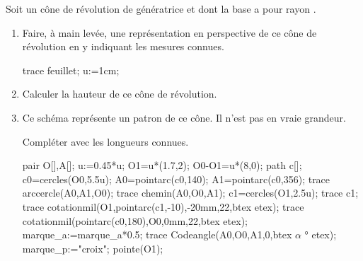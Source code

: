\begin{exercice*}
    Soit un cône de révolution de génératrice  et dont la base a pour rayon .
    \begin{enumerate}
        \item Faire, à main levée, une représentation en perspective de ce cône de révolution en y indiquant les mesures connues.
        \begin{center}
            \begin{Geometrie}[CoinBG={(-4u,-2u)},CoinHD={(5u,6u)}]
                trace feuillet;
                u:=1cm;
            \end{Geometrie}
        \end{center}
        \item Calculer la hauteur de ce cône de révolution.
        \item Ce schéma représente un patron de ce cône. Il n'est pas en vraie grandeur.
        
        Compléter avec les longueurs connues.
        \begin{center}
            \begin{Geometrie}[CoinBG={(-4u,-2u)}]
                pair O[],A[];
                u:=0.45*u;
                O1=u*(1.7,2);
                O0-O1=u*(8,0);            
                path c[];
                c0=cercles(O0,5.5u);
                A0=pointarc(c0,140);
                A1=pointarc(c0,356);
                trace arccercle(A0,A1,O0);
                trace chemin(A0,O0,A1);
                c1=cercles(O1,2.5u);
                trace c1;
                trace cotationmil(O1,pointarc(c1,-10),-20mm,22,btex \pointilles[5mm] \Lg[cm]{} etex);
                trace cotationmil(pointarc(c0,180),O0,0mm,22,btex \pointilles[10mm] \Lg[cm]{} etex);
                marque_a:=marque_a*0.5;
                trace Codeangle(A0,O0,A1,0,btex $\alpha$ ° etex);
                marque_p:="croix";
                pointe(O1);
            \end{Geometrie}


\end{center}
\end{enumerate}
\end{exercice*}
